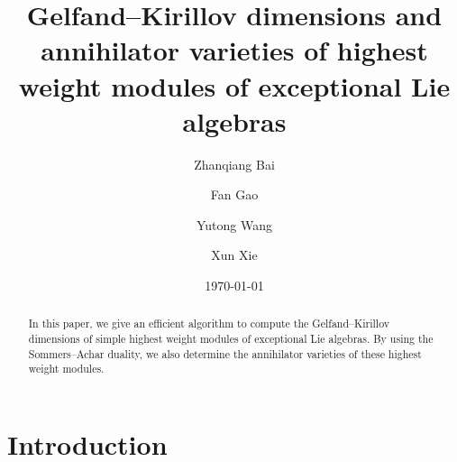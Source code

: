 \documentclass[reqno,12pt]{amsart}
\numberwithin{equation}{section}
\theoremstyle{plain}
\theoremstyle{definition}
\begin{document}
%
\title[GK dimensions and annihilator varieties]{Gelfand--Kirillov dimensions and annihilator varieties of highest weight modules of exceptional Lie algebras
}
\author{Zhanqiang Bai}\author{Fan Gao}\author{Yutong Wang}\author{Xun Xie}

\address[Bai]{School of Mathematical Sciences, Soochow University, Suzhou 215006,  China}

 \address[Gao]{School of Mathematical Sciences, Zhejiang University, Hangzhou 310058,  China}




\address[Wang]{School of Mathematical Sciences,  Peking University, Beijing, 100871, China}

\address[Xie]{School of Mathematics and Statistics, Beijing Institute of Technology, Beijing 100081, China}



\date{\today}



\begin{abstract}
In this paper, we give  an efficient algorithm to compute the Gelfand--Kirillov dimensions of simple highest weight modules of exceptional  Lie algebras. By using the Sommers--Achar duality, we also determine the annihilator varieties of these highest weight modules.
\end{abstract}
\maketitle




\tableofcontents

\section{Introduction}

\end{document}
